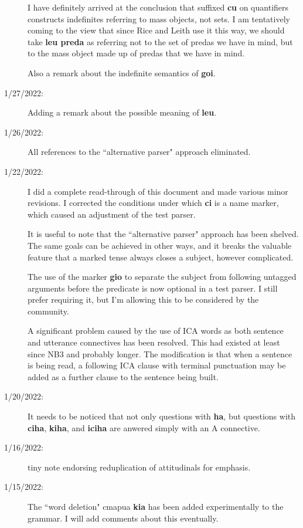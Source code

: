 \documentclass[12pt]{book}
\begin{document}
\begin{description}
I have definitely arrived at the conclusion that suffixed {\bf cu} on quantifiers constructs indefinites referring to mass objects, not sets.  I am tentatively coming to the view that since Rice and Leith use it this way, we should take {\bf leu preda} as referring not to the set of predas we have in mind, but to the mass object made up of predas that we have in mind.

Also a remark about the indefinite semantics of {\bf goi}.

\item[1/27/2022:]  Adding a remark about the possible meaning of {\bf leu}.

\item[1/26/2022:]  All references to the ``alternative parser" approach eliminated.

\item[1/22/2022:]  I did a complete read-through of this document and made various minor revisions.  I corrected the conditions under which {\bf ci} is a name marker, which caused an adjustment of the test parser.


It is useful to note that the ``alternative parser" approach has been shelved.  The same goals can be achieved in other ways, and it breaks the valuable feature that a marked tense always closes a subject, however complicated.

The use of the marker {\bf gio} to separate the subject from following untagged arguments before the predicate is now optional in a test parser.  I still prefer requiring it, but I'm allowing this to be considered by the community.

A significant problem caused by the use of ICA words as both sentence and utterance connectives has been resolved.  This had existed at least since NB3 and probably longer.  The modification is that when a sentence is being read, a following ICA clause with terminal punctuation may be added as a further clause to the sentence being built.

\item[1/20/2022:]  It needs to be noticed that not only questions with {\bf ha}, but questions with {\bf ciha}, {\bf kiha}, and {\bf iciha} are anwered simply with an A connective.

\item[1/16/2022:] tiny note endorsing reduplication of attitudinals for emphasis.

\item[1/15/2022:]  The ``word deletion" cmapua {\bf kia} has been added experimentally to the grammar.  I will add comments about this eventually.


\end{description}
\end{document}
